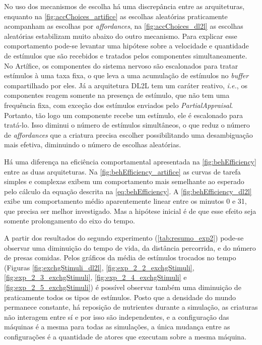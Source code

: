 No uso dos mecanismos de escolha há uma discrepância entre as arquiteturas, enquanto na \autoref{fig:accChoices_artifice} as escolhas aleatórias praticamente acompanham as escolhas por \textit{affordances}, na \autoref{fig:accChoices_dl2l} as escolhas aleatórias estabilizam muito abaixo do outro mecanismo. Para explicar esse comportamento pode-se levantar uma hipótese sobre a velocidade e quantidade de estímulos que são recebidos e tratados pelos componentes simultaneamente. No Artífice, os componentes do sistema nervoso são escalonados para tratar estímulos à uma taxa fixa, o que leva a uma acumulação de estímulos no \textit{buffer} compartilhado por eles. Já a arquitetura DL2L tem um caráter reativo, \textit{i.e.}, os componentes reagem somente na presença de estímulo, que não tem uma frequência fixa, com exceção dos estímulos enviados pelo \textit{PartialAppraisal}. Portanto, tão logo um componente recebe um estímulo, ele é escalonado para tratá-lo. Isso diminui o número de estímulos simultâneos, o que reduz o número de \textit{affordances} que a criatura precisa escolher possibilitando uma desambiguação mais efetiva, diminuindo o número de escolhas aleatórias. 

Há uma diferença na eficiência comportamental apresentada na \autoref{fig:behEfficiency} entre as duas arquiteturas. Na \autoref{fig:behEfficiency_artifice} as curvas de tarefa simples e complexas exibem um comportamento mais semelhante ao esperado pelo cálculo da equação descrita na \autoref{eq:behEfficiency}. A \autoref{fig:behEfficiency_dl2l} exibe um comportamento médio aparentemente linear entre os minutos 0 e 31, que precisa ser melhor investigado. Mas a hipótese inicial é de que esse efeito seja somente prolongamento do eixo do tempo.

A partir dos resultados do segundo experimento (\autoref{tab:resumo_exp2}) pode-se observar uma diminuição do tempo de vida, da distância percorrida, e do número de presas comidas. Pelos gráficos da média de estímulos trocados no tempo (Figuras \ref{fig:exchgStimuli_dl2l}, \ref{fig:exp_2_2_exchgStimuli}, \ref{fig:exp_2_3_exchgStimuli}, \ref{fig:exp_2_4_exchgStimuli} e \ref{fig:exp_2_5_exchgStimuli}) é possível observar também uma diminuição de praticamente todos os tipos de estímulos. Posto que a densidade do mundo permanece constante, há reposição de nutrientes durante a simulação, as criaturas não interagem entre sí e por isso são independentes, e a configuração das máquinas é a mesma para todas as simulações, a única mudança entre as configurações é a quantidade de atores que executam sobre a mesma máquina. 

